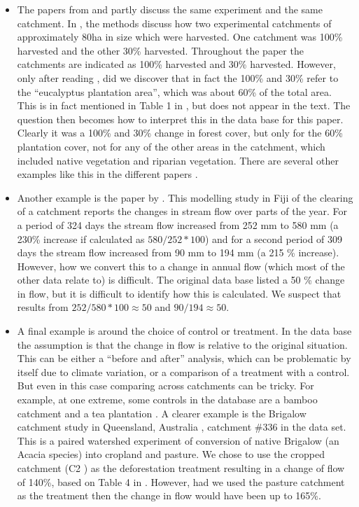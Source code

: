 \documentclass[]{elsarticle} %
\providecommand{\tightlist}{%
  \setlength{\itemsep}{0pt}\setlength{\parskip}{0pt}}
\begin{document}
\begin{itemize}
\tightlist
\item
  The papers from \citet{almeida2016} and \citet{ferreto2020} partly discuss the same experiment and the same catchment. In \citet{almeida2016}, the methods discuss how two experimental catchments of approximately 80ha in size which were harvested. One catchment was 100\% harvested and the other 30\% harvested. Throughout the paper the catchments are indicated as 100\% harvested and 30\% harvested. However, only after reading \citet{ferreto2020}, did we discover that in fact the 100\% and 30\% refer to the ``eucalyptus plantation area'', which was about 60\% of the total area. This is in fact mentioned in Table 1 in \citet{almeida2016}, but does not appear in the text. The question then becomes how to interpret this in the data base for this paper. Clearly it was a 100\% and 30\% change in forest cover, but only for the 60\% plantation cover, not for any of the other areas in the catchment, which included native vegetation and riparian vegetation. There are several other examples like this in the different papers \citep[for example][]{blackie1979kimakia, blackie1979kericho}.
\item
  Another example is the paper by \citet{waterloo2007}. This modelling study in Fiji of the clearing of a catchment reports the changes in stream flow over parts of the year. For a period of 324 days the stream flow increased from 252 mm to 580 mm (a 230\% increase if calculated as \(580/252*100\)) and for a second period of 309 days the stream flow increased from 90 mm to 194 mm (a 215 \% increase). However, how we convert this to a change in annual flow (which most of the other data relate to) is difficult. The original data base listed a 50 \% change in flow, but it is difficult to identify how this is calculated. We suspect that results from \(252/580*100 \approx 50\) and \(90/194 \approx 50\).
\item
  A final example is around the choice of control or treatment. In the data base the assumption is that the change in flow is relative to the original situation. This can be either a ``before and after'' analysis, which can be problematic by itself due to climate variation, or a comparison of a treatment with a control. But even in this case comparing across catchments can be tricky. For example, at one extreme, some controls in the database are a bamboo catchment and a tea plantation \citep{blackie1979kimakia, blackie1979kericho}. A clearer example is the Brigalow catchment study in Queensland, Australia \citep{thornton2007brigalow}, catchment \#336 in the data set. This is a paired watershed experiment of conversion of native Brigalow (an Acacia species) into cropland and pasture. We chose to use the cropped catchment (C2 \citet{thornton2007brigalow}) as the deforestation treatment resulting in a change of flow of 140\%, based on Table 4 in \citet{thornton2007brigalow}. However, had we used the pasture catchment as the treatment then the change in flow would have been up to 165\%.
\end{itemize}
\end{document}
